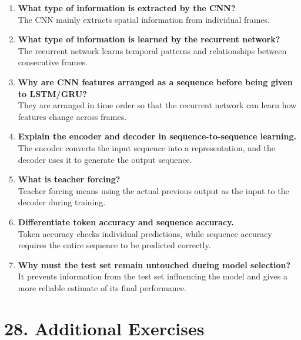 \documentclass[10pt]{article}
\begin{document}
\begin{enumerate}
\item \textbf{What type of information is extracted by the CNN?}\\
The CNN mainly extracts spatial information from individual frames.

\item \textbf{What type of information is learned by the recurrent network?}\\
The recurrent network learns temporal patterns and relationships between consecutive frames.

\item \textbf{Why are CNN features arranged as a sequence before being given to LSTM/GRU?}\\
They are arranged in time order so that the recurrent network can learn how features change across frames.

\item \textbf{Explain the encoder and decoder in sequence-to-sequence learning.}\\
The encoder converts the input sequence into a representation, and the decoder uses it to generate the output sequence.

\item \textbf{What is teacher forcing?}\\
Teacher forcing means using the actual previous output as the input to the decoder during training.

\item \textbf{Differentiate token accuracy and sequence accuracy.}\\
Token accuracy checks individual predictions, while sequence accuracy requires the entire sequence to be predicted correctly.

\item \textbf{Why must the test set remain untouched during model selection?}\\
It prevents information from the test set influencing the model and gives a more reliable estimate of its final performance.

\end{enumerate}



\section*{28. Additional Exercises}
\end{document}

